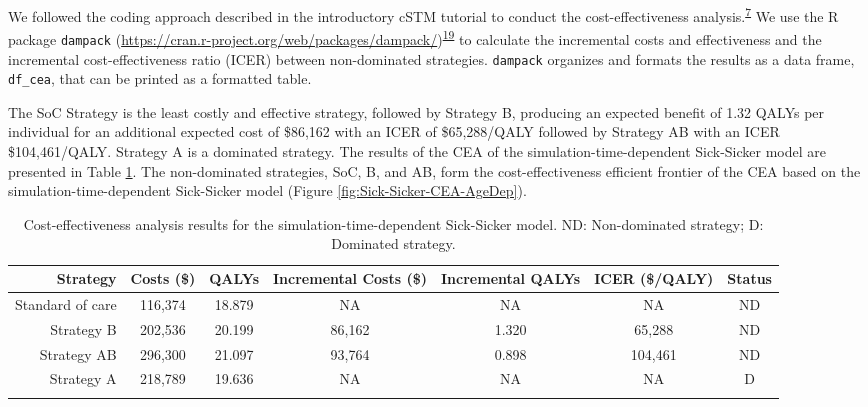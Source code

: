 \documentclass[
]{article}
\begin{document}
We followed the coding approach described in the introductory cSTM tutorial to conduct the cost-effectiveness analysis.\textsuperscript{\protect\hyperlink{ref-Alarid-Escudero2022b}{7}} We use the R package \texttt{dampack} (\url{https://cran.r-project.org/web/packages/dampack/})\textsuperscript{\protect\hyperlink{ref-Alarid-Escudero2021}{19}} to calculate the incremental costs and effectiveness and the incremental cost-effectiveness ratio (ICER) between non-dominated strategies. \texttt{dampack} organizes and formats the results as a data frame, \texttt{df\_cea}, that can be printed as a formatted table.

The SoC Strategy is the least costly and effective strategy, followed by Strategy B, producing an expected benefit of 1.32 QALYs per individual for an additional expected cost of \$86,162 with an ICER of \$65,288/QALY followed by Strategy AB with an ICER \$104,461/QALY. Strategy A is a dominated strategy. The results of the CEA of the simulation-time-dependent Sick-Sicker model are presented in Table \ref{tab:table-cea}. The non-dominated strategies, SoC, B, and AB, form the cost-effectiveness efficient frontier of the CEA based on the simulation-time-dependent Sick-Sicker model (Figure \ref{fig:Sick-Sicker-CEA-AgeDep}).

\begin{table}[!h]

\caption{\label{tab:table-cea}Cost-effectiveness analysis results for the simulation-time-dependent Sick-Sicker model. ND: Non-dominated strategy; D: Dominated strategy.}
\centering
\begin{tabular}[t]{rcccccc}
\toprule{}
Strategy & Costs (\$) & QALYs & Incremental Costs (\$) & Incremental QALYs & ICER (\$/QALY) & Status\\
\midrule{}
Standard of care & 116,374 & 18.879 & NA & NA & NA & ND\\
Strategy B & 202,536 & 20.199 & 86,162 & 1.320 & 65,288 & ND\\
Strategy AB & 296,300 & 21.097 & 93,764 & 0.898 & 104,461 & ND\\
Strategy A & 218,789 & 19.636 & NA & NA & NA & D\\
\bottomrule{}
\end{tabular}
\end{table}
\end{document}
